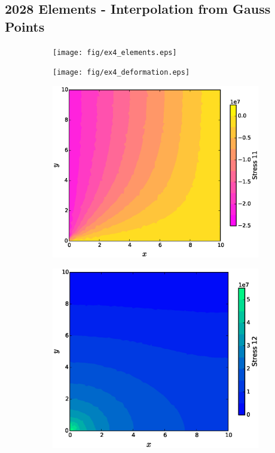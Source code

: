 \documentclass[11pt, a4paper]{article}
\numberwithin{equation}{section}
\begin{document}
\subsection{2028 Elements - Interpolation from Gauss Points}


\begin{figure}[H]
\centering
	\begin{subfigure}[H]{0.49\textwidth}
		\texttt{[image: fig/ex4\_elements.eps]}
		\caption{}
		\label{fig:1}
	\end{subfigure}
	\begin{subfigure}[H]{0.49\textwidth}
		\texttt{[image: fig/ex4\_deformation.eps]}
		\caption{}
		\label{fig:2}
	\end{subfigure}	
	\begin{subfigure}[H]{0.49\textwidth}
		\includegraphics[width=\textwidth]{fig/ex4_stress_11.eps}
		\caption{}
		\label{fig:1}
	\end{subfigure}
		\begin{subfigure}[H]{0.49\textwidth}
		\includegraphics[width=\textwidth]{fig/ex4_stress_12.eps}

\end{subfigure}
\end{figure}
\end{document}
